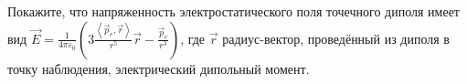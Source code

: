 \documentclass[__main__.tex]{subfiles}
\begin{document}
Покажите, что напряженность электростатического поля точечного диполя имеет вид $\vec{E} = \frac{1}{4\pi\varepsilon_0}\left( 3\frac{\left<\vec{p}_e, \vec{r}\right>}{r^5}\vec{r} - \frac{\vec{p}_e}{r^3}\right)$, где $\vec{r}$ радиус-вектор, проведённый из диполя в точку наблюдения, электрический дипольный момент.\\ 

\end{document}
